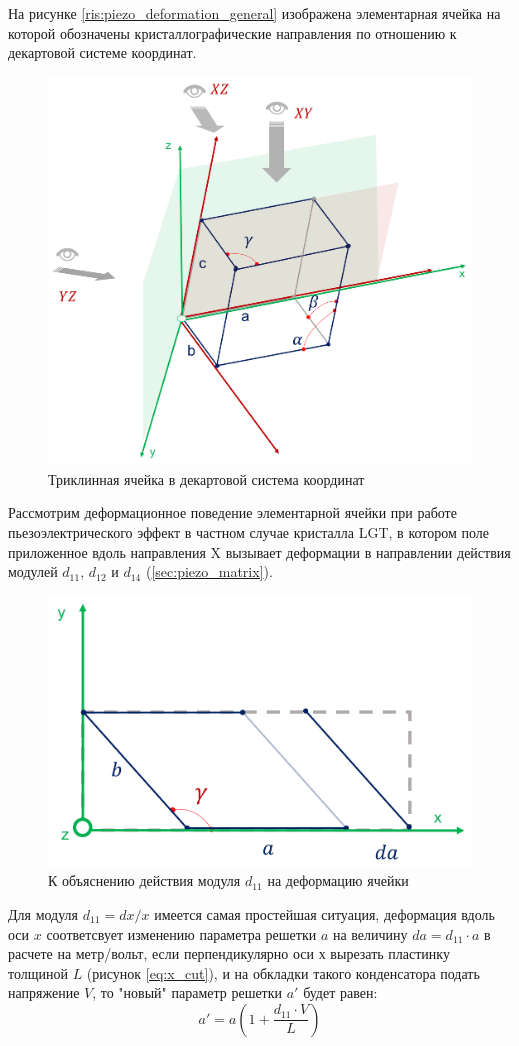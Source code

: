 На рисунке \ref{ris:piezo_deformation_general} изображена элементарная ячейка
на которой обозначены кристаллографические направления по отношению к декартовой
системе координат.

\begin{figure}[H]
  \centering
  \includegraphics[width=.6\textwidth]{images/piezo_deformation_general.png}
  \caption{Триклинная ячейка в декартовой система координат}
  \label{ris:piezo_deformation_general}
\label{ris:}
\end{figure}



Рассмотрим деформационное поведение элементарной ячейки при работе пьезоэлектрического
эффект в частном случае кристалла LGT, в котором поле приложенное вдоль направления X
вызывает деформации в направлении действия модулей $d_{11}$, $d_{12}$ и $d_{14}$ (\ref{sec:piezo_matrix}).

\begin{figure}[H]
  \centering
  \includegraphics[width=.5\textwidth]{images/d11.png}
  \caption{К объяснению действия модуля $d_{11}$ на деформацию ячейки}
  \label{ris:d11}
\end{figure}

Для модуля $d_{11}=dx/x$ имеется самая простейшая ситуация, деформация вдоль оси $x$
соответсвует изменению параметра решетки $a$ на величину $da = d_{11}\cdot a$ в расчете
на метр/вольт, если перпендикулярно оси $х$ вырезать пластинку толщиной $L$
(рисунок \ref{eq:x_cut}), и на обкладки такого конденсатора подать напряжение
$V$, то "новый" параметр решетки $a{'}$ будет равен:
\begin{equation}
   a{'}  = a \left(1+\frac{d_{11}\cdot V }{L}\right)
   \label{eq:a_deformed}
\end{equation}

